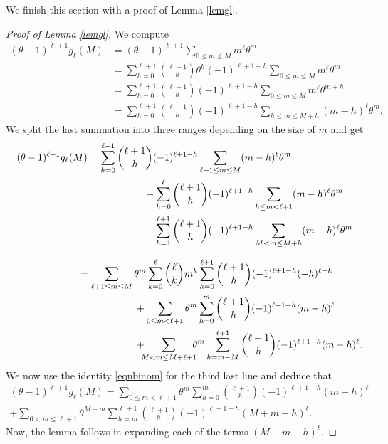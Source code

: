 \documentclass[JEP,XML,SOM,Unicode,published]{cedram}
\let\tet\theta
\theoremstyle{definition}
\numberwithin{theorem}{section}
\begin{document}
We finish this section with a proof of Lemma \ref{lemgl}.

\begin{proof}[Proof of Lemma \ref{lemgl}]
We compute
\begin{equation*}
\begin{split}
(\tet-1)^{\ell+1}g_\ell(M)&= (\tet-1)^{\ell+1}\sum_{0\leq m\leq M} m^\ell \tet^m \\
&= \sum_{h=0}^{\ell+1}\binom{\ell+1}{h}\tet^h (-1)^{\ell+1-h}\sum_{0\leq m\leq M} m^\ell \tet^m\\
&= \sum_{h=0}^{\ell+1} \binom{\ell+1}{h} (-1)^{\ell+1-h}\sum_{0\leq m\leq M}m^\ell \tet^{m+h}\\
&= \sum_{h=0}^{\ell+1} \binom{\ell+1}{h} (-1)^{\ell+1-h} \sum_{h\leq m\leq M+h} (m-h)^\ell \tet^m.
\end{split}
\end{equation*}
We split the last summation into three ranges depending on the size of $m$ and get
\begin{align*}
(\tet-1)^{\ell+1}g_\ell(M)&= \sum_{h=0}^{\ell+1} \binom{\ell+1}{h} (-1)^{\ell+1-h} \sum_{\ell+1\leq m\leq M} (m-h)^\ell \tet^m\\
&\hspace*{2cm}+ \sum_{h=0}^{\ell} \binom{\ell+1}{h} (-1)^{\ell+1-h} \sum_{h\leq m < \ell+1} (m-h)^\ell \tet^m\\
&\hspace*{2cm}+\sum_{h=1}^{\ell+1} \binom{\ell+1}{h} (-1)^{\ell+1-h} \sum_{M < m\leq M+h} (m-h)^\ell \tet^m
\end{align*}
\par
\vspace*{-\baselineskip}
\begin{align*}
\hphantom{(\tet-1)^{\ell+1}g_\ell(M)}&= \sum_{\ell+1\leq m\leq M} \tet^m \sum_{k=0}^\ell \binom{\ell}{k} m^k \sum_{h=0}^{\ell+1} \binom{\ell+1}{h} (-1)^{\ell+1-h} (-h)^{\ell-k}\\
&\hspace*{2cm}+\sum_{0\leq m <\ell+1} \tet^m \sum_{h=0}^{m} \binom{\ell+1}{h} (-1)^{\ell+1-h}(m-h)^\ell \\
&\hspace*{2cm}+\hspace*{-2mm}\sum_{M<m\leq M+\ell+1}\hspace*{-2mm} \tet^m \sum_{h=m-M}^{\ell+1} \binom{\ell+1}{h} (-1)^{\ell+1-h} (m-h)^\ell.
\end{align*}
We now use the identity \eqref{eqnbinom} for the third last line and deduce that
\begin{multline*}
(\tet-1)^{\ell+1}g_\ell(M)=\sum_{0\leq m <\ell+1} \tet^m \sum_{h=0}^{m} \binom{\ell+1}{h} (-1)^{\ell+1-h}(m-h)^\ell \\
+\sum_{0<m\leq \ell+1} \tet^{M+m} \sum_{h=m}^{\ell+1} \binom{\ell+1}{h} (-1)^{\ell+1-h} (M+m-h)^\ell.
\end{multline*}
Now, the lemma follows in expanding each of the terms $(M+m-h)^\ell$.
\end{proof}
\end{document}
